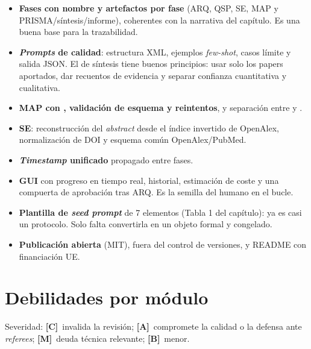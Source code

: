 \documentclass[11pt,a4paper]{article}
\newcommand{\sevC}{\textcolor{crit}{\textbf{[C]}}}
\newcommand{\sevA}{\textcolor{alto}{\textbf{[A]}}}
\newcommand{\sevM}{\textcolor{medio}{\textbf{[M]}}}
\newcommand{\sevB}{\textcolor{bajo}{\textbf{[B]}}}
\begin{document}
\begin{itemize}
  \item \textbf{Fases con nombre y artefactos por fase} (ARQ, QSP, SE, MAP y PRISMA/síntesis/informe), coherentes con la narrativa del capítulo. Es una buena base para la trazabilidad.
  \item \textbf{\emph{Prompts} de calidad}: estructura XML, ejemplos \emph{few-shot}, casos límite y salida JSON. El de síntesis tiene buenos principios: usar solo los papers aportados, dar recuentos de evidencia y separar confianza cuantitativa y cualitativa.
  \item \textbf{MAP con , validación de esquema y reintentos}, y separación entre  y .
  \item \textbf{SE}: reconstrucción del \emph{abstract} desde el índice invertido de OpenAlex, normalización de DOI y esquema común OpenAlex/PubMed.
  \item \textbf{\emph{Timestamp} unificado} propagado entre fases.
  \item \textbf{GUI} con progreso en tiempo real, historial, estimación de coste y una compuerta de aprobación tras ARQ. Es la semilla del humano en el bucle.
  \item \textbf{Plantilla de \emph{seed prompt}} de 7 elementos (Tabla 1 del capítulo): ya es casi un protocolo. Solo falta convertirla en un objeto formal y congelado.
  \item \textbf{Publicación abierta} (MIT),  fuera del control de versiones,  y README con financiación UE.
\end{itemize}

\section{Debilidades por módulo}\label{sec:debilidades}

Severidad: \sevC~invalida la revisión; \sevA~compromete la calidad o la defensa ante \emph{referees}; \sevM~deuda técnica relevante; \sevB~menor.
\end{document}
